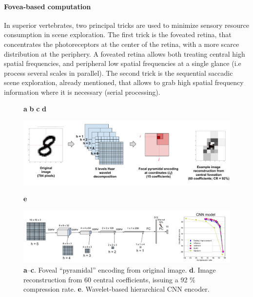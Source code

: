 \documentclass{article}
\begin{document}
\paragraph{Fovea-based computation} 
In superior vertebrates, two principal tricks are used to minimize sensory resource consumption in scene exploration. The first trick is the foveated retina, that concentrates the photoreceptors at the center of the retina, with a more scarce distribution at the periphery. A foveated retina allows both treating central high spatial frequencies, and peripheral low spatial frequencies at a single glance (i.e process several scales in parallel). The second trick is the sequential saccadic scene exploration, already mentioned, that allows to grab high spatial frequency information where it is necessary (serial processing).



\begin{figure}[b!]
	\centerline{
		\hspace{2cm}
		\textbf{a}
		\hspace{4cm}
		\textbf{b}	
		\hspace{3cm}
		\textbf{c}
		\hspace{3cm}
		\textbf{d}
		\hspace{2cm}			
	}
	\centerline{
		\includegraphics[width = \linewidth]{img/ICLR-foveated-model.pdf} 
	}
\centerline{\textbf{e}}	
\centerline{
	\includegraphics[width = \linewidth]{img/NIPS-convolutional.pdf} 
}
	\caption{\textbf{a}--\textbf{c}. Foveal ``pyramidal'' encoding from original image.
	\textbf{d}. Image reconstruction from 60 central coefficients, issuing a 92 \% compression rate.  
	\textbf{e}. Wavelet-based hierarchical CNN encoder.}\label{fig:foveated}
\end{figure}
\end{document}
